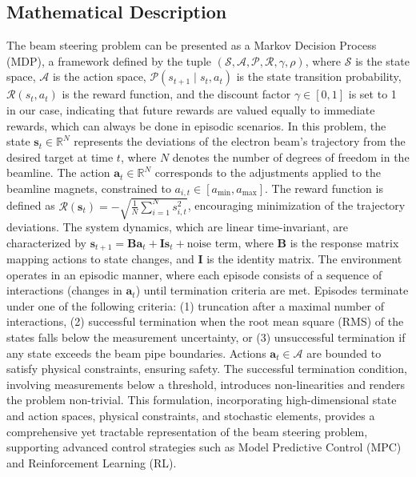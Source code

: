\documentclass[journal,article,submit,pdftex,moreauthors]{Definitions/mdpi}
\begin{document}
\subsection{Mathematical Description}
The beam steering problem can be presented as a Markov Decision Process (MDP), a framework defined by the tuple $(\mathcal{S}, \mathcal{A}, \mathcal{P}, \mathcal{R}, \gamma, \rho)$, where $\mathcal{S}$ is the state space, $\mathcal{A}$ is the action space, $\mathcal{P}(s_{t+1} \mid s_t, a_t)$ is the state transition probability, $\mathcal{R}(s_t, a_t)$ is the reward function, and the discount factor $\gamma \in [0,1]$  is set to 1 in our case, indicating that future rewards are valued equally to immediate rewards, which can always be done in episodic scenarios. In this problem, the state $\mathbf{s}_t \in \mathbb{R}^N$ represents the deviations of the electron beam's trajectory from the desired target at time $t$, where $N$ denotes the number of degrees of freedom in the beamline. The action $\mathbf{a}_t \in \mathbb{R}^N$ corresponds to the adjustments applied to the beamline magnets, constrained to $a_{i,t} \in [a_{\text{min}}, a_{\text{max}}]$. The reward function is defined as $\mathcal{R}(\mathbf{s}_t) = -\sqrt{\frac{1}{N} \sum_{i=1}^N s_{i,t}^2}$, encouraging minimization of the trajectory deviations. The system dynamics, which are linear time-invariant, are characterized by $\mathbf{s}_{t+1} = \mathbf{B} \mathbf{a}_t + \mathbf{I} \mathbf{s}_t + \text{noise term}$, where $\mathbf{B}$ is the response matrix mapping actions to state changes, and $\mathbf{I}$ is the identity matrix. The environment operates in an episodic manner, where each episode consists of a sequence of interactions (changes in $\mathbf{a}_t$) until termination criteria are met. Episodes terminate under one of the following criteria: (1) truncation after a maximal number of interactions, (2) successful termination when the root mean square (RMS) of the states falls below the measurement uncertainty, or (3) unsuccessful termination if any state exceeds the beam pipe boundaries. Actions $\mathbf{a}_t \in \mathcal{A}$ are bounded to satisfy physical constraints, ensuring safety. The successful termination condition, involving measurements below a threshold, introduces non-linearities and renders the problem non-trivial. This formulation, incorporating high-dimensional state and action spaces, physical constraints, and stochastic elements, provides a comprehensive yet tractable representation of the beam steering problem, supporting advanced control strategies such as Model Predictive Control (MPC) and Reinforcement Learning (RL).
\end{document}
